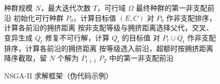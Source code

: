 \begin{figure}[!htb]
  \centering
  \begin{minipage}{0.86\linewidth}
    \setlength{\intextsep}{0pt}
    \begin{algorithm}[H]
      \caption{NSGA-II 求解框架（伪代码示例）}
      \label{alg:nsga2}
      \begin{algorithmic}[1]
        \Require 种群规模 $N$，最大迭代次数 $T$，可行域 $\Omega$
        \Ensure 最终种群的第一非支配前沿
        \State 初始化可行种群 $P_0$，计算目标值 $(E,C)$
        \State 对 $P_0$ 作非支配排序，计算各前沿的拥挤距离
          \State 按非支配等级与拥挤距离选择父代，交叉、变异生成 $Q_t$
          \State 修复不可行解，计算 $Q_t$ 的目标值
          \State 对 $P_t\cup Q_t$ 作非支配排序，计算各前沿的拥挤距离
          \State 按等级选入前沿，超额时按拥挤距离降序截取，留 $N$ 个解为 $P_{t+1}$
        \EndFor
        \State \Return $P_T$ 中的第一非支配前沿
      \end{algorithmic}
    \end{algorithm}
  \end{minipage}
\end{figure}
